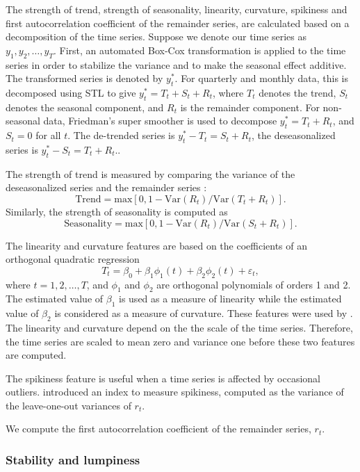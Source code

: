 \documentclass[11pt,a4paper,]{article}
\def\var{\text{Var}}
\begin{document}
The strength of trend, strength of seasonality, linearity, curvature,
spikiness and first autocorrelation coefficient of the remainder series,
are calculated based on a decomposition of the time series. Suppose we
denote our time series as \(y_1, y_2, \dots,y_T\). First, an automated
Box-Cox transformation \autocite{Guerrero1993} is applied to the time
series in order to stabilize the variance and to make the seasonal
effect additive. The transformed series is denoted by \(y_{t}^*\). For
quarterly and monthly data, this is decomposed using STL
\autocite{cleveland1990stl} to give \(y_t^*=T_t+S_t+R_t\), where \(T_t\)
denotes the trend, \(S_t\) denotes the seasonal component, and \(R_t\)
is the remainder component. For non-seasonal data, Friedman's super
smoother \autocite{supsmu} is used to decompose \(y_t^*=T_t+R_t\), and
\(S_t=0\) for all \(t\). The de-trended series is \(y_t^*-T_t=S_t+R_t\),
the deseasonalized series is \(y_t^*-S_t = T_t+R_t\)..

The strength of trend is measured by comparing the variance of the
deseasonalized series and the remainder series \autocite{wang2009rule}:
\[
    \text{Trend} = \text{max}\left[0, 1 - \var(R_{t})/\var(T_t+R_t)\right].
\] Similarly, the strength of seasonality is computed as \[
    \text{Seasonality} = \text{max}\left[0, 1- \var(R_{t})/ \var(S_t+R_t)\right].
\]

The linearity and curvature features are based on the coefficients of an
orthogonal quadratic regression \[
  T_t=\beta_0+\beta_1 \phi_1(t) + \beta_2\phi_2(t) + \varepsilon_t,
\] where \(t=1, 2, \dots,T\), and \(\phi_1\) and \(\phi_2\) are
orthogonal polynomials of orders 1 and 2. The estimated value of
\(\beta_1\) is used as a measure of linearity while the estimated value
of \(\beta_2\) is considered as a measure of curvature. These features
were used by \textcite{hyndman2015large}. The linearity and curvature
depend on the the scale of the time series. Therefore, the time series
are scaled to mean zero and variance one before these two features are
computed.

The spikiness feature is useful when a time series is affected by
occasional outliers. \textcite{hyndman2015large} introduced an index to
measure spikiness, computed as the variance of the leave-one-out
variances of \(r_t\).

We compute the first autocorrelation coefficient of the remainder
series, \(r_t\).

\subsubsection*{Stability and lumpiness}\label{stability-and-lumpiness}
\end{document}
